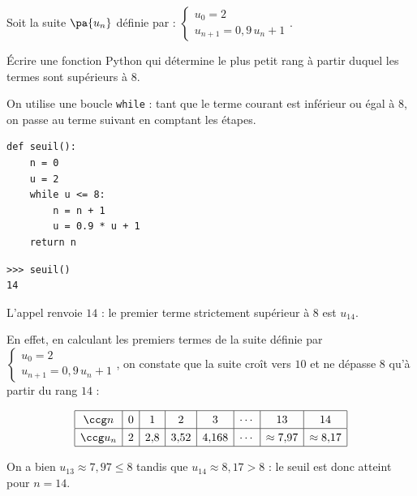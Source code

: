 \begin{methode}
	Soit la suite $\pa{u_n}$ définie par : $\begin{cases}u_0 = 2\\u_{n+1} = 0{,}9\,u_n + 1\end{cases}$.

	Écrire une fonction Python qui détermine le plus petit rang à partir duquel les termes sont supérieurs à $8$.

	\begin{correction}
		On utilise une boucle \texttt{while} : tant que le terme courant est inférieur ou égal à $8$, on passe au terme suivant en comptant les étapes.

		\begin{lstlisting}
def seuil():
    n = 0
    u = 2
    while u <= 8:
        n = n + 1
        u = 0.9 * u + 1
    return n
\end{lstlisting}
		\begin{lstlisting}
>>> seuil()
14
\end{lstlisting}

		L'appel renvoie $14$ : le premier terme strictement supérieur à $8$ est $u_{14}$.

		En effet, en calculant les premiers termes de la suite définie par $\begin{cases}u_0 = 2\\u_{n+1} = 0{,}9\,u_n + 1\end{cases}$, on constate que la suite croît vers $10$ et ne dépasse $8$ qu'à partir du rang $14$ :

		\[
			\def\arraystretch{1.3}
			\begin{array}{|c|c|c|c|c|c|c|c|} \hline
				\ccg n   & 0 & 1     & 2      & 3       & \cdots & 13             & 14             \\ \hline
				\ccg u_n & 2 & 2{,}8 & 3{,}52 & 4{,}168 & \cdots & \approx 7{,}97 & \approx 8{,}17 \\ \hline
			\end{array}
		\]

		On a bien $u_{13} \approx 7{,}97 \leq 8$ tandis que $u_{14} \approx 8{,}17 > 8$ : le seuil est donc atteint pour $n = 14$.
	\end{correction}
\end{methode}

